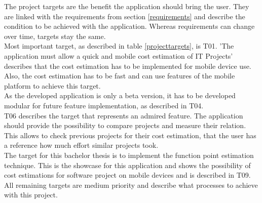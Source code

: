 The project targets are the benefit the application should bring the user. They are linked with the requirements from section \ref{requirements} and describe the condition to be achieved with the application. Whereas requirements can change over time, targets stay the same.\\
Most important target, as described in table \ref{projecttargets}, is T01. 'The application must allow a quick and mobile cost estimation of IT Projects' describes that the cost estimation has to be implemented for mobile device use. Also, the cost estimation has to be fast and can use features of the mobile platform to achieve this target.\\
As the developed application is only a beta version, it has to be developed modular for future feature implementation, as described in T04.\\
T06 describes the target that represents an admired feature. The application should provide the possibility to compare projects and measure their relation. This allows to check previous projects for their cost estimation, that the user has a reference how much effort similar projects took.\\
The target for this bachelor thesis is to implement the function point estimation technique. This is the showcase for this application and shows the possibility of cost estimations for software project on mobile devices and is described in T09.\\
All remaining targets are medium priority and describe what processes to achieve with this project.\\

